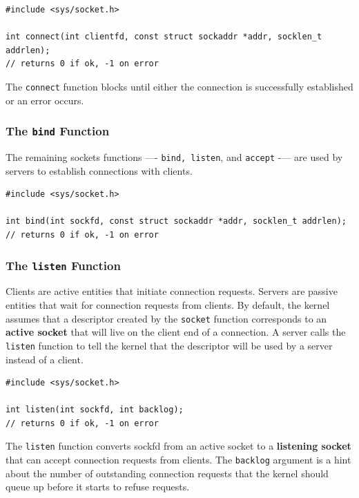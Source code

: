 \documentclass[11pt]{article}
\begin{document}
\begin{verbatim}
#include <sys/socket.h>

int connect(int clientfd, const struct sockaddr *addr, socklen_t addrlen);
// returns 0 if ok, -1 on error
\end{verbatim}

The \texttt{connect} function blocks until either the connection is successfully established or an error occurs.\\

\subsubsection{The \texttt{bind} Function}
\label{sec:orgdd6ecac}
The remaining sockets functions —- \texttt{bind, listen}, and \texttt{accept} -— are used by servers to establish connections with clients.\\

\begin{verbatim}
#include <sys/socket.h>

int bind(int sockfd, const struct sockaddr *addr, socklen_t addrlen);
// returns 0 if ok, -1 on error
\end{verbatim}

\subsubsection{The \texttt{listen} Function}
\label{sec:org550e3a6}

Clients are active entities that initiate connection requests. Servers are passive entities that wait for connection requests from clients. By default, the kernel assumes that a descriptor created by the \texttt{socket} function corresponds to an \textbf{active socket} that will live on the client end of a connection. A server calls the \texttt{listen} function to tell the kernel that the descriptor will be used by a server instead of a client.\\

\begin{verbatim}
#include <sys/socket.h>

int listen(int sockfd, int backlog);
// returns 0 if ok, -1 on error
\end{verbatim}

The \texttt{listen} function converts sockfd from an active socket to a \textbf{listening socket} that can accept connection requests from clients. The \texttt{backlog} argument is a hint about the number of outstanding connection requests that the kernel should queue up before it starts to refuse requests.\\
\end{document}
